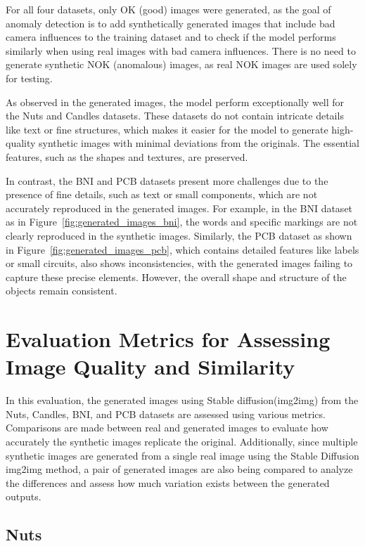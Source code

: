 \documentclass[12pt,DIV14,BCOR12mm,a4paper,footinclude=false,headinclude,parskip=half-,twoside,openright,cleardoublepage=empty,toc=index,bibliography=totoc,listof=totoc]{scrreprt}
\numberwithin{equation}{chapter}
\begin{document}
For all four datasets, only OK (good) images were generated, as the goal of anomaly detection is to add synthetically generated images that include bad camera influences to the training dataset and to check if the model performs similarly when using real images with bad camera influences. There is no need to generate synthetic NOK (anomalous) images, as real NOK images are used solely for testing.

As observed in the generated images, the model perform exceptionally well for the Nuts and Candles datasets. These datasets do not contain intricate details like text or fine structures, which makes it easier for the model to generate high-quality synthetic images with minimal deviations from the originals. The essential features, such as the shapes and textures, are preserved.

In contrast, the BNI and PCB datasets present more challenges due to the presence of fine details, such as text or small components, which are not accurately reproduced in the generated images. For example, in the BNI dataset as in Figure~\ref{fig:generated_images_bni}, the words and specific markings are not clearly reproduced in the synthetic images. Similarly, the PCB dataset as shown in Figure~\ref{fig:generated_images_pcb}, which contains detailed features like labels or small circuits, also shows inconsistencies, with the generated images failing to capture these precise elements. However, the overall shape and structure of the objects remain consistent.

\section{Evaluation Metrics for Assessing Image Quality and Similarity}

In this evaluation, the generated images using Stable diffusion(img2img) from the Nuts, Candles, BNI, and PCB datasets are assessed using various metrics. Comparisons are made between real and generated images to evaluate how accurately the synthetic images replicate the original. Additionally, since multiple synthetic images are generated from a single real image using the Stable Diffusion img2img method, a pair of generated images are also being compared to analyze the differences and assess how much variation exists between the generated outputs.

\subsection{Nuts}
\end{document}
